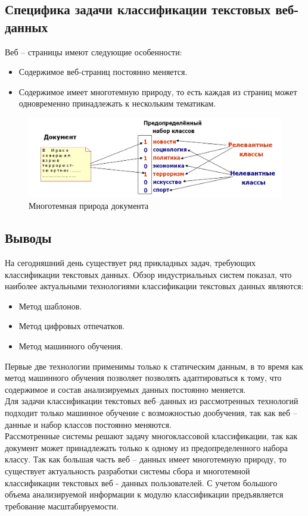 \documentclass[russian, utf8, emptystyle]{eskdtext}
\begin{document}
\subsection{Специфика задачи классификации текстовых веб-данных}

Веб – страницы имеют следующие особенности:
\begin{itemize}
	\item Содержимое веб-страниц постоянно меняется.
	\item Содержимое имеет многотемную природу, то есть каждая  из страниц может одновременно принадлежать к нескольким тематикам.
\end{itemize}
	\begin{figure}[h]
		\begin{center}
			\includegraphics[width=14cm]{pic/Nature.png}
			\caption{Многотемная природа документа}
			\label{fig:low_sigma}
		\end{center}
	\end{figure}
\subsection{Выводы}
На сегодняшний день существует ряд прикладных задач, требующих классификации текстовых данных. Обзор индустриальных систем показал, что наиболее актуальными технологиями классификации текстовых данных являются:
\begin{itemize}
	\item Метод шаблонов.
	\item Метод цифровых отпечатков.
	\item Метод машинного обучения.
\end{itemize}

Первые две технологии применимы только к статическим данным, в то время как метод машинного обучения позволяет позволять адаптироваться к тому, что содержимое и состав анализируемых данных постоянно меняется.\\
Для задачи классификации текстовых веб–данных из рассмотренных технологий подходит только машинное обучение с возможностью дообучения, так как веб – данные и набор классов постоянно меняются. \\
Рассмотренные системы решают задачу многоклассовой классификации, так как документ может принадлежать только к одному из предопределенного набора классу. Так как большая часть веб – данных имеет многотемную природу, то существует актуальность разработки системы сбора и многотемной классификации текстовых веб - данных пользователей. С учетом большого объема анализируемой информации к модулю классификации предъявляется требование масштабируемости. \\
\end{document}
